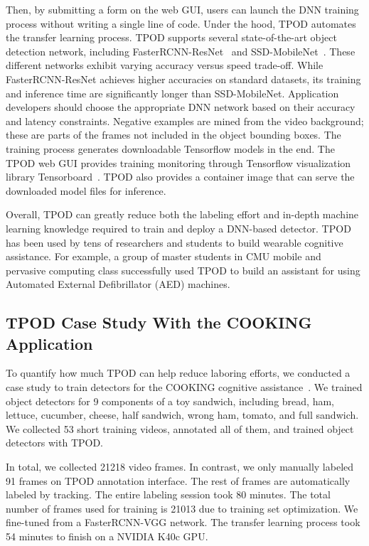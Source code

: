 Then, by submitting a form on the web GUI, users can launch the DNN training
process without writing a single line of code. Under the hood, TPOD automates
the transfer learning process. TPOD supports several state-of-the-art object
detection network, including FasterRCNN-ResNet~\cite{ren2015faster,He2016} and
SSD-MobileNet~\cite{Liu2016,Howard2017}. These different networks exhibit
varying accuracy versus speed trade-off. While FasterRCNN-ResNet achieves higher
accuracies on standard datasets, its training and inference time are
significantly longer than SSD-MobileNet. Application developers should choose
the appropriate DNN network based on their accuracy and latency constraints.
Negative examples are mined from the video background; these are parts of the
frames not included in the object bounding boxes.  The training process
generates downloadable Tensorflow models in the end. The TPOD web GUI provides
training monitoring through Tensorflow visualization library
Tensorboard~\cite{tensorflow2017}. TPOD also provides a container image that can
serve the downloaded model files for inference.

Overall, TPOD can greatly reduce both the labeling effort and in-depth machine
learning knowledge required to train and deploy a DNN-based detector. TPOD has
been used by tens of researchers and students to build wearable cognitive
assistance. For example, a group of master students in CMU mobile and pervasive
computing class successfully used TPOD to build an assistant for using Automated
External Defibrillator (AED) machines.

\subsection{TPOD Case Study With the COOKING Application}

To quantify how much TPOD can help reduce laboring efforts, we conducted a case
study to train detectors for the COOKING cognitive
assistance~\cite{chen2018application}. We trained object detectors for 9
components of a toy sandwich, including bread, ham, lettuce, cucumber, cheese,
half sandwich, wrong ham, tomato, and full sandwich. We collected 53 short
training videos, annotated all of them, and trained object detectors with TPOD.

In total, we collected 21218 video frames. In contrast, we only manually labeled
91 frames on TPOD annotation interface. The rest of frames are automatically
labeled by tracking. The entire labeling session took 80 minutes. The total
number of frames used for training is 21013 due to training set optimization. We
fine-tuned from a FasterRCNN-VGG network. The transfer learning process took 54
minutes to finish on a NVIDIA K40c GPU.


